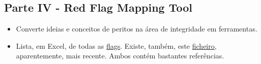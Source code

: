 \documentclass{book}
\begin{document}
  
%  
%  
%  
%  
%  
%  
%  
%  
%  
%  
%  
%  
%  
%  
%  
%  

\subsection*{Parte IV - Red Flag Mapping Tool}

\begin{itemize}
	
	\item Converte ideias e conceitos de peritos na área de integridade em ferramentas. 
	
	\item Lista, em Excel, de todas as \href{https://docs.google.com/spreadsheets/d/19OTpHcl92GHixsX31IfpDbs-jCnNr9KyDqu1cr38xsY/edit#gid=0}{flags}. Existe, também, este \href{https://docs.google.com/spreadsheets/d/12PFkUlQH09jQvcnORjcbh9-8d-NnIuk4mAQwdGiXeSM/edit#gid=656314485}{ficheiro}, aparentemente, mais recente. Ambos contém bastantes referências. 
\end{itemize}
\end{document}
